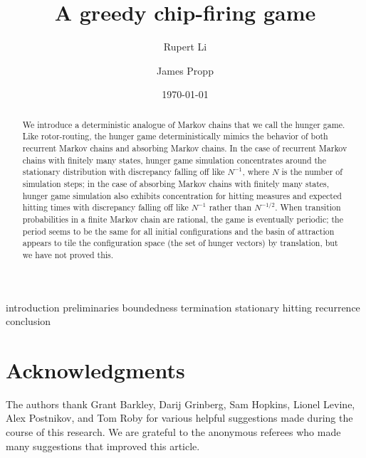 \documentclass[11pt]{amsart}
\begin{document}
\title[A greedy chip-firing game]{A greedy chip-firing game}
\author[Rupert Li]{Rupert Li}
\address{Massachusetts Institute of Technology}
\author[James Propp]{James Propp}
\address{University of Massachusetts Lowell, Department of Mathematical Sciences}
\date{\today}

\begin{abstract}
We introduce a deterministic analogue of Markov chains 
that we call the hunger game.  
Like rotor-routing, the hunger game
deterministically mimics the behavior of both recurrent Markov chains 
and absorbing Markov chains.
In the case of recurrent Markov chains with finitely many states, 
hunger game simulation concentrates around the stationary distribution
with discrepancy falling off like $N^{-1}$,
where $N$ is the number of simulation steps;
in the case of absorbing Markov chains with finitely many states, 
hunger game simulation also exhibits concentration 
for hitting measures and expected hitting times
with discrepancy falling off like $N^{-1}$
rather than $N^{-1/2}$.
When transition probabilities in a finite Markov chain are rational,
the game is eventually periodic;
the period seems to be the same for all initial configurations
and the basin of attraction appears to tile the configuration space 
(the set of hunger vectors) by translation,
but we have not proved this.
\end{abstract}

\maketitle

{introduction}
{preliminaries}
{boundedness}
{termination}
{stationary}
{hitting}
{recurrence}
{conclusion}

\section*{Acknowledgments}
The authors thank Grant Barkley, Darij Grinberg,
Sam Hopkins, Lionel Levine, Alex Postnikov, and Tom Roby
for various helpful suggestions made during the course of this research.
We are grateful to the anonymous referees who made many suggestions that improved this article.



\end{document}
